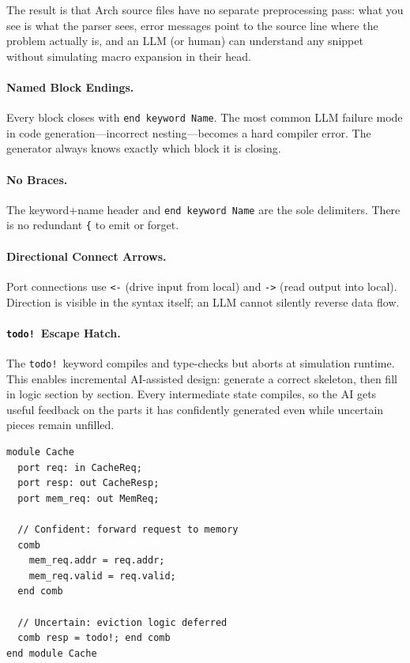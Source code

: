 \documentclass[11pt,twocolumn]{article}
\begin{document}
The result is that Arch source files have no separate preprocessing pass: what you see is what the parser sees, error messages point to the source line where the problem actually is, and an LLM (or human) can understand any snippet without simulating macro expansion in their head.

\paragraph{Named Block Endings.} Every block closes with \texttt{end keyword Name}. The most common LLM failure mode in code generation---incorrect nesting---becomes a hard compiler error. The generator always knows exactly which block it is closing.

\paragraph{No Braces.} The keyword+name header and \texttt{end keyword Name} are the sole delimiters. There is no redundant \texttt{\{} to emit or forget.

\paragraph{Directional Connect Arrows.} Port connections use \texttt{<-} (drive input from local) and \texttt{->} (read output into local). Direction is visible in the syntax itself; an LLM cannot silently reverse data flow.

\paragraph{\texttt{todo!}\ Escape Hatch.} The \texttt{todo!}\ keyword compiles and type-checks but aborts at simulation runtime. This enables incremental AI-assisted design: generate a correct skeleton, then fill in logic section by section. Every intermediate state compiles, so the AI gets useful feedback on the parts it has confidently generated even while uncertain pieces remain unfilled.

\begin{lstlisting}[language=Arch,caption={Partial implementation with \texttt{todo!}},label={lst:todo}]
module Cache
  port req: in CacheReq;
  port resp: out CacheResp;
  port mem_req: out MemReq;

  // Confident: forward request to memory
  comb
    mem_req.addr = req.addr;
    mem_req.valid = req.valid;
  end comb

  // Uncertain: eviction logic deferred
  comb resp = todo!; end comb
end module Cache
\end{lstlisting}
\end{document}
